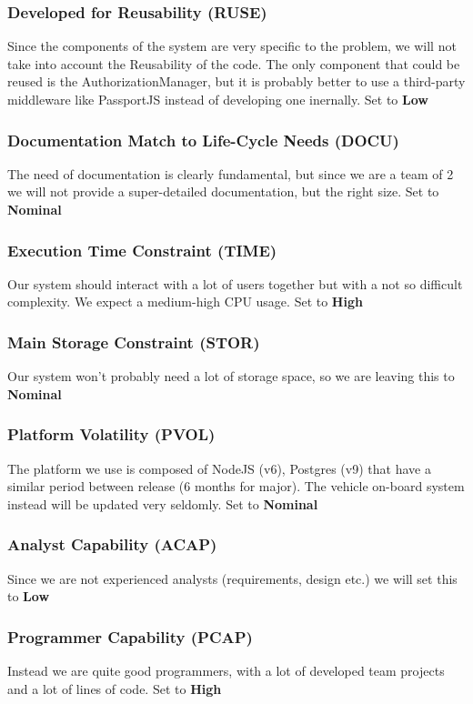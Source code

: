 \subsubsection{Developed for Reusability (RUSE)}
Since the components of the system are very specific to the problem, we will not take into account the Reusability of the code. The only component that could be reused is the AuthorizationManager, but it is probably better to use a third-party middleware like PassportJS instead of developing one inernally. Set to \textbf{Low}
\subsubsection{Documentation Match to Life-Cycle Needs (DOCU)}
The need of documentation is clearly fundamental, but since we are a team of 2 we will not provide a super-detailed documentation, but the right size. Set to \textbf{Nominal}
\subsubsection{Execution Time Constraint (TIME)}
Our system should interact with a lot of users together but with a not so difficult complexity. We expect a medium-high CPU usage. Set to \textbf{High}
\subsubsection{Main Storage Constraint (STOR)}
Our system won't probably need a lot of storage space, so we are leaving this to \textbf{Nominal}
\subsubsection{Platform Volatility (PVOL)}
The platform we use is composed of NodeJS (v6), Postgres (v9) that have a similar period between release (6 months for major). The vehicle on-board system instead will be updated very seldomly. Set to \textbf{Nominal}
\subsubsection{Analyst Capability (ACAP)}
Since we are not experienced analysts (requirements, design etc.) we will set this to \textbf{Low}
\subsubsection{Programmer Capability (PCAP)}
Instead we are quite good programmers, with a lot of developed team projects and a lot of lines of code. Set to \textbf{High}
